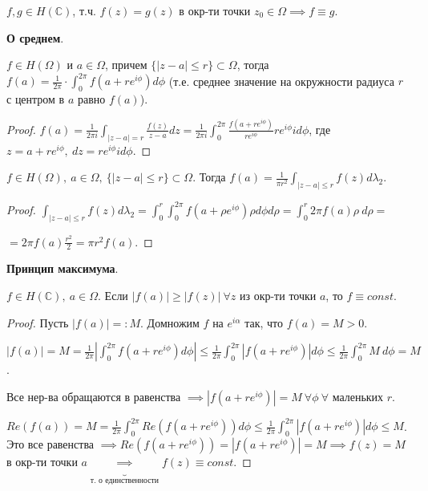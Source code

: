 \begin{consequence}
    $f, g \in H(\mathbb{C})$, т.ч. $f(z) = g(z)$ в окр-ти точки $z_0 \in \Omega \implies f \equiv g$.
\end{consequence}



\begin{theorem}
    \textbf{О среднем}.

    $f \in H(\Omega)$ и $a \in \Omega$, причем $\{ |z - a| \leq r \} \subset \Omega$, тогда $f(a) = \frac{1}{2\pi} \cdot \int_{0}^{2\pi} { f(a + r e^{i \phi}) d \phi }$ (т.е. среднее значение на окружности радиуса $r$ с центром в $a$ равно $f(a)$).
\end{theorem}
\begin{proof}
    $f(a) = \frac{1}{2 \pi i}\int_{|z - a| = r}{ \frac{f(z)}{z - a} dz } = \frac{1}{2 \pi i} \int_{0}^{2\pi} { \frac{f(a + r e^{i \phi})}{r e^{i \phi}} r e^{i \phi} i d \phi }$, где $z = a+re^{i\phi}, \ dz = r e^{i \phi} i d \phi$.
\end{proof}

\begin{consequence}
    $f \in H(\Omega), \ a \in \Omega, \ \{ |z - a| \leq r \} \subset \Omega$. Тогда $f(a) = \frac{1}{\pi r^2} \int_{|z-a|\leq r} { f(z) d \lambda_2 }$.
\end{consequence}
\begin{proof}
    $\int_{|z-a| \leq r} { f(z) d \lambda_2 } = \int_{0}^{r} { \int_{0}^{2\pi} {f(a + \rho e^{i\phi}) \rho d \phi } d \rho } = \int_{0}^{r} { 2 \pi f(a) \rho \ d \rho } =$
    
    $= 2 \pi f(a) \frac{r^2}{2} = \pi r^2 f(a)$.
\end{proof}

\begin{theorem}
    \textbf{Принцип максимума}.

    $f \in H(\mathbb{C}), \ a \in \Omega$. Если $|f(a)| \geq |f(z)| \ \forall z$ из окр-ти точки $a$, то $f \equiv const$.
\end{theorem}
\begin{proof}
    Пусть $|f(a)| =: M$. Домножим $f$ на $e^{i \alpha}$ так, что $f(a) = M > 0$.

    $|f(a)| = M = \frac{1}{2\pi} \left|\int_{0}^{2\pi} { f(a + r e^{i \phi}) d \phi }\right| \leq \frac{1}{2 \pi} \int_{0}^{2\pi} { |f(a + r e^{i \phi})| d \phi} \leq \frac{1}{2\pi} \int_{0}^{2\pi} { M \ d \phi } = M$.

    Все нер-ва обращаются в равенства $\implies |f(a + r e^{i \phi})| = M \ \forall \phi \ \forall$ маленьких $r$.

    $Re (f(a)) = M = \frac{1}{2\pi} \int_{0}^{2\pi} { Re(f(a + r e^{i \phi})) d \phi } \leq \frac{1}{2 \pi} \int_{0}^{2\pi} { |f(a + r e^{i \phi})| d \phi } \leq M$. Это все равенства $\implies Re (f(a + r e^{i \phi})) = |f(a + r e^{i \phi})| = M \implies f(z) = M$ в окр-ти точки $a \underbrace{\implies}_{\text{т. о единственности}} f(z) \equiv const$.
\end{proof}


